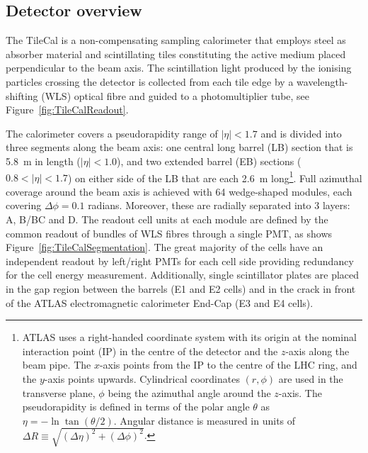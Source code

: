 \newcommand{\AtlasCoordFootnote}{
ATLAS uses a right-handed coordinate system with its origin at the nominal interaction point (IP)
in the centre of the detector and the \(z\)-axis along the beam pipe.
The \(x\)-axis points from the IP to the centre of the LHC ring,
and the \(y\)-axis points upwards.
Cylindrical coordinates \((r,\phi)\) are used in the transverse plane, 
\(\phi\) being the azimuthal angle around the \(z\)-axis.
The pseudorapidity is defined in terms of the polar angle \(\theta\) as \(\eta = -\ln \tan(\theta/2)\).
Angular distance is measured in units of \(\Delta R \equiv \sqrt{(\Delta\eta)^{2} + (\Delta\phi)^{2}}\).}

\subsection{Detector overview}

The TileCal is a non-compensating sampling calorimeter that employs steel as absorber material and scintillating tiles constituting the active medium placed perpendicular to the beam axis. The scintillation light produced by the ionising particles crossing the detector is collected from each tile edge by a wavelength-shifting (WLS) optical fibre and guided to a photomultiplier tube, see Figure~\ref{fig:TileCalReadout}. 

The calorimeter covers a pseudorapidity range of $|\eta| < 1.7$ and is divided into three segments along the beam axis: one central long barrel (LB) section that is 5.8~m in length ($|\eta| < 1.0$), and two extended barrel (EB) sections ($0.8 < |\eta| < 1.7$) on either side of the LB that are each 2.6~m long\footnote{\AtlasCoordFootnote}. Full azimuthal coverage around the beam axis is achieved with 64 wedge-shaped modules, each covering $\Delta \phi = 0.1$ radians. 
Moreover, these are radially separated into 3 layers: A, B/BC and D. The readout cell units at each module are defined by the common readout of bundles of WLS fibres through a single PMT, as shows Figure~\ref{fig:TileCalSegmentation}. The great majority of the cells have an independent readout by left/right PMTs for each cell side providing redundancy for the cell energy measurement. Additionally, single scintillator plates are placed in the gap region between the barrels (E1 and E2 cells) and in the crack in front of the ATLAS electromagnetic calorimeter End-Cap (E3 and E4 cells).

